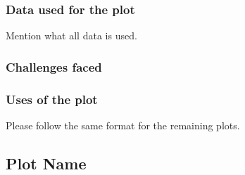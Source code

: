 \documentclass[12pt]{article}
\begin{document}
\subsubsection{Data used for the plot}
Mention what all data is used.
\subsubsection{Challenges faced}
\subsubsection{Uses of the plot}

\bigskip
Please follow the same format for the remaining plots.
\subsection{Plot Name}
\end{document}
